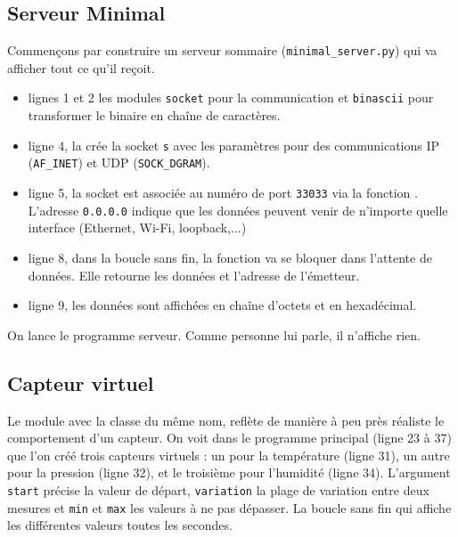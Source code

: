 \subsection{Serveur Minimal}\label{chap-mini-serv}



Commençons par construire un serveur sommaire (\texttt{minimal\_server.py}) qui va afficher tout ce qu'il reçoit. 
\begin{itemize}
    \item lignes 1 et 2 les modules \texttt{socket} pour la communication et \texttt{binascii} pour transformer le binaire en chaîne de caractères.
    \item ligne 4, la  crée la socket \texttt{s} avec les paramètres pour des communications IP (\texttt{AF\_INET}) et UDP (\texttt{SOCK\_DGRAM}).
    \item ligne 5, la socket est associée au numéro de port \texttt{33033} via la fonction . L'adresse \texttt{0.0.0.0} indique que les données peuvent venir de n'importe quelle interface (Ethernet, Wi-Fi, loopback,...) 
    \item ligne 8, dans la boucle sans fin, la fonction  va se bloquer dans l'attente de données. Elle retourne les données et l'adresse de l'émetteur.
    \item ligne 9, les données sont affichées en chaîne d'octets et en hexadécimal.
    
\end{itemize}

     \vspace{1em}

On lance le programme serveur. Comme personne lui parle, il n'affiche rien. 

\subsection{Capteur virtuel}


Le module  avec la classe du même nom, reflète de manière à peu près réaliste le comportement d'un capteur. On voit dans le programme principal (ligne 23 à 37) que l'on créé trois capteurs virtuels : un pour la température (ligne 31), un autre pour la pression (ligne 32), et le troisième pour l'humidité (ligne 34). L'argument \texttt{start} précise la valeur de départ, \texttt{variation} la plage de variation entre deux mesures et \texttt{min} et \texttt{max} les valeurs à ne pas dépasser. La boucle sans fin qui affiche les différentes valeurs toutes les secondes.

